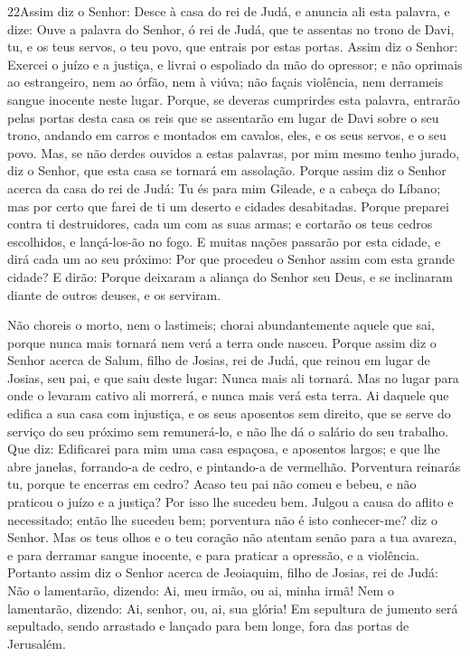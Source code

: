 \medskip

\lettrine{22} Assim diz o Senhor: Desce à casa do rei de Judá,
e anuncia ali esta palavra, e dize: Ouve a palavra do Senhor, ó
rei de Judá, que te assentas no trono de Davi, tu, e os teus servos,
o teu povo, que entrais por estas portas. Assim diz o Senhor:
Exercei o juízo e a justiça, e livrai o espoliado da mão do
opressor; e não oprimais ao estrangeiro, nem ao órfão, nem à viúva;
não façais violência, nem derrameis sangue inocente neste lugar.
Porque, se deveras cumprirdes esta palavra, entrarão pelas
portas desta casa os reis que se assentarão em lugar de Davi sobre o
seu trono, andando em carros e montados em cavalos, eles, e os seus
servos, e o seu povo. Mas, se não derdes ouvidos a estas
palavras, por mim mesmo tenho jurado, diz o Senhor, que esta casa se
tornará em assolação. Porque assim diz o Senhor acerca da casa
do rei de Judá: Tu és para mim Gileade, e a cabeça do Líbano; mas
por certo que farei de ti um deserto e cidades desabitadas.
Porque preparei contra ti destruidores, cada um com as suas
armas; e cortarão os teus cedros escolhidos, e lançá-los-ão no fogo.
E muitas nações passarão por esta cidade, e dirá cada um ao seu
próximo: Por que procedeu o Senhor assim com esta grande cidade?
E dirão: Porque deixaram a aliança do Senhor seu Deus, e se
inclinaram diante de outros deuses, e os serviram.

Não choreis o morto, nem o lastimeis; chorai abundantemente
aquele que sai, porque nunca mais tornará nem verá a terra onde
nasceu. Porque assim diz o Senhor acerca de Salum, filho de
Josias, rei de Judá, que reinou em lugar de Josias, seu pai, e que
saiu deste lugar: Nunca mais ali tornará. Mas no lugar para
onde o levaram cativo ali morrerá, e nunca mais verá esta terra.
Ai daquele que edifica a sua casa com injustiça, e os seus
aposentos sem direito, que se serve do serviço do seu próximo sem
remunerá-lo, e não lhe dá o salário do seu trabalho. Que diz:
Edificarei para mim uma casa espaçosa, e aposentos largos; e que lhe
abre janelas, forrando-a de cedro, e pintando-a de vermelhão.
Porventura reinarás tu, porque te encerras em cedro? Acaso
teu pai não comeu e bebeu, e não praticou o juízo e a justiça? Por
isso lhe sucedeu bem. Julgou a causa do aflito e necessitado;
então lhe sucedeu bem; porventura não é isto conhecer-me? diz o
Senhor. Mas os teus olhos e o teu coração não atentam senão
para a tua avareza, e para derramar sangue inocente, e para praticar
a opressão, e a violência. Portanto assim diz o Senhor acerca
de Jeoiaquim, filho de Josias, rei de Judá: Não o lamentarão,
dizendo: Ai, meu irmão, ou ai, minha irmã! Nem o lamentarão,
dizendo: Ai, senhor, ou, ai, sua glória! Em sepultura de
jumento será sepultado, sendo arrastado e lançado para bem longe,
fora das portas de Jerusalém.

